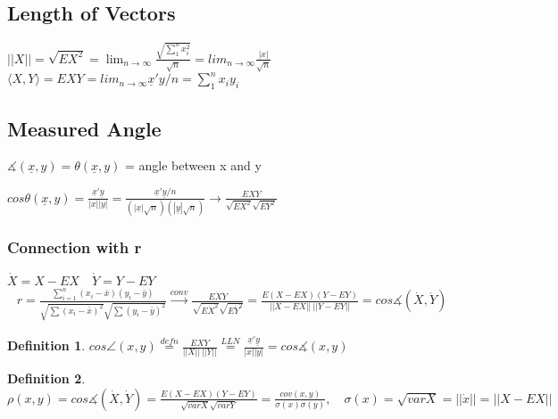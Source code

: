 \documentclass{article}
\theoremstyle{definition}
\newtheorem{definition}{Definition}[section]
\theoremstyle{thrm}
\theoremstyle{lma}
\theoremstyle{ppst}
\theoremstyle{crlr}
\begin{document}
\subsection{Length of Vectors}
$||X|| = \sqrt{EX^2} = \lim_{n\to \infty}\frac{\sqrt{\sum_1^nx_i^2}}{\sqrt{n}} = lim_{n\to \infty}\frac{|x|}{\sqrt{n}}$\\
$\langle X, Y \rangle = EXY = lim_{n\to \infty} \underline{x}'y/n = \sum_1^nx_iy_i$
\subsection{Measured Angle}
$\measuredangle(\underline{x}, y) = \theta(\underline{x},y)$ = angle between x and y\\
{
\center
{}
}
$cos\theta(\underline{x},y) = \frac{\underline{x}'\underline{y}}{|x||y|} = \frac{\underline{x}'\underline{y}/n}{(|\underline{x}|\sqrt{n})(|\underline{y}|\sqrt{n})}\to \frac{EXY}{\sqrt{EX^2}\sqrt{EY^2}}$\\
\subsubsection{Connection with r}
$\dot{X} = X-EX\quad \dot{Y} = Y-EY$\\
\begin{align*}
	r = \frac{\sum_{i=1}^n(x_i-\bar{x})(y_i-\bar{y})}{\sqrt{\sum(x_i-\bar{x})^2}\sqrt{\sum(y_i-\bar{y})^2}} \stackrel{conv}{\rightarrow}\frac{E\dot{X}\dot{Y}}{\sqrt{E\dot{X}^2}\sqrt{E\dot{Y}^2}} = \frac{E(X-EX)(Y-EY)}{||X-EX||\ ||Y-EY||} = cos \measuredangle(\dot{X}, \dot{Y})
\end{align*}
\begin{definition}
	$cos\angle(x,y)\stackrel{defn}{=}\frac{EXY}{||X||\ ||Y||}\stackrel{LLN}{=}\frac{\underline{x}'\underline{y}}{|x||y|} = cos\measuredangle(x,y)$
\end{definition}
\begin{definition}
	$\rho(x,y) = cos\measuredangle(\dot{X}, \dot{Y}) = \frac{E(X-EX)(Y-EY)}{\sqrt{varX}\sqrt{varY}} = \frac{cov(x,y)}{\sigma(x)\sigma(y)},\quad \sigma(x) = \sqrt{varX} = ||\dot{x}|| = ||X-EX||$
\end{definition}
\end{document}
